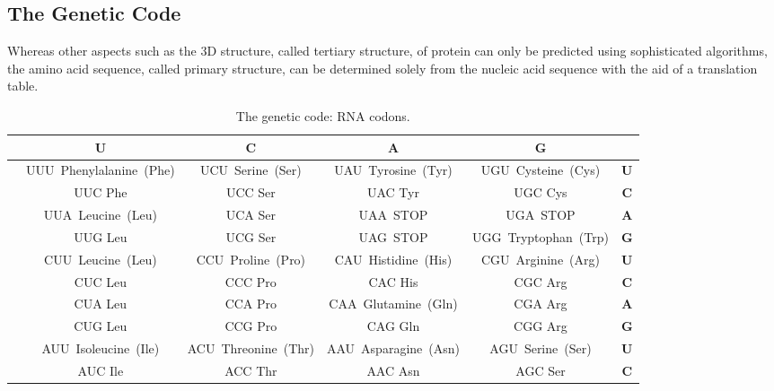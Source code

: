 \hypertarget{the-genetic-code}{%
\subsection{The Genetic Code}\label{the-genetic-code}}

Whereas other aspects such as the 3D structure, called tertiary structure, of protein can only be predicted using sophisticated algorithms, the amino acid sequence, called primary structure, can be determined solely from the nucleic acid sequence with the aid of a translation table.

\onecolumn

\begingroup\fontsize{9}{11}\selectfont

\begin{longtable}[t]{>{\bfseries}ccccc>{\bfseries}c}
\caption{\label{tab:geneticcode}The genetic code: RNA codons.}\\
\toprule
 & U & C & A & G & \\
\midrule
\rowcolor{gray!6}   & UUU Phenylalanine (Phe) & UCU Serine (Ser) & UAU Tyrosine (Tyr) & UGU Cysteine (Cys) & U\\

 & UUC Phe & UCC Ser & UAC Tyr & UGC Cys & C\\

\rowcolor{gray!6}   & UUA Leucine (Leu) & UCA Ser & UAA STOP & UGA STOP & A\\

\multirow{-4}{*}{\centering\arraybackslash U} & UUG Leu & UCG Ser & UAG STOP & UGG Tryptophan (Trp) & G\\
\cmidrule{1-6}
\rowcolor{gray!6}   & CUU Leucine (Leu) & CCU Proline (Pro) & CAU Histidine (His) & CGU Arginine (Arg) & U\\

 & CUC Leu & CCC Pro & CAC His & CGC Arg & C\\

\rowcolor{gray!6}   & CUA Leu & CCA Pro & CAA Glutamine (Gln) & CGA Arg & A\\

\multirow{-4}{*}{\centering\arraybackslash C} & CUG Leu & CCG Pro & CAG Gln & CGG Arg & G\\
\cmidrule{1-6}
\rowcolor{gray!6}   & AUU Isoleucine (Ile) & ACU Threonine (Thr) & AAU Asparagine (Asn) & AGU Serine (Ser) & U\\

 & AUC Ile & ACC Thr & AAC Asn & AGC Ser & C\\


\end{longtable}
